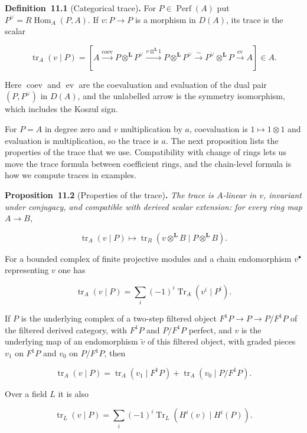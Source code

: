 \documentclass[11pt]{article}
\newenvironment{bpstatement}[2]{\par\addvspace{0.6\baselineskip}\noindent\textbf{#1}#2\textbf{.}\enspace\ignorespaces}
  {\par\addvspace{0.4\baselineskip}}
\newenvironment{bpstatementit}[2]{\begin{bpstatement}{#1}{#2}\itshape\ignorespaces}{\end{bpstatement}}
\begin{document}
\label{bp174}%
\begin{bpstatement}{Definition~11.1}{ (Categorical trace)}
For \(P\in\operatorname{Perf}(A)\) put \(P^\vee=R\!\operatorname{Hom}_A(P,A)\). If \(v:P\to P\) is a morphism in \(D(A)\), its trace is the scalar

\[
\operatorname{tr}_A(v\mid P)=
\left[A\xrightarrow{\operatorname{coev}}P\otimes^{\mathbf L} P^\vee
\xrightarrow{v\otimes^{\mathbf L}1}P\otimes^{\mathbf L} P^\vee
\xrightarrow{\sim}P^\vee\otimes^{\mathbf L} P
\xrightarrow{\operatorname{ev}}A\right]\in A.
\]

Here \(\operatorname{coev}\) and \(\operatorname{ev}\) are the coevaluation and evaluation of the dual pair \((P,P^\vee)\) in \(D(A)\), and the unlabelled arrow is the symmetry isomorphism, which includes the Koszul sign.
\end{bpstatement}

\label{bp175}%
For \(P=A\) in degree zero and \(v\) multiplication by \(a\), coevaluation is \(1\mapsto1\otimes1\) and evaluation is multiplication, so the trace is \(a\). The next proposition lists the properties of the trace that we use. Compatibility with change of rings lets us move the trace formula between coefficient rings, and the chain-level formula is how we compute traces in examples.

\label{bp176}%
\begin{bpstatementit}{Proposition~11.2}{ (Properties of the trace)}
The trace is \(A\)-linear in \(v\), invariant under conjugacy, and compatible with derived scalar extension: for every ring map \(A\to B\),

\[
\operatorname{tr}_A(v\mid P)\longmapsto
\operatorname{tr}_B(v\otimes^{\mathbf L} B\mid P\otimes^{\mathbf L} B).
\]

For a bounded complex of finite projective modules and a chain endomorphism \(v^\bullet\) representing \(v\) one has

\[
\operatorname{tr}_A(v\mid P)
=\sum_i(-1)^i\operatorname{Tr}_A(v^i\mid P^i).
\]

If \(P\) is the underlying complex of a two-step filtered object \(F^1P\to P\to P/F^1P\) of the filtered derived category, with \(F^1P\) and \(P/F^1P\) perfect, and \(v\) is the underlying map of an endomorphism \(\tilde v\) of this filtered object, with graded pieces \(v_1\) on \(F^1P\) and \(v_0\) on \(P/F^1P\), then

\[
\operatorname{tr}_A(v\mid P)=\operatorname{tr}_A(v_1\mid F^1P)
+\operatorname{tr}_A(v_0\mid P/F^1P).
\]

Over a field \(L\) it is also

\[
\operatorname{tr}_L(v\mid P)
=\sum_i(-1)^i\operatorname{Tr}_L(H^i(v)\mid H^i(P)).
\]
\end{bpstatementit}
\end{document}
